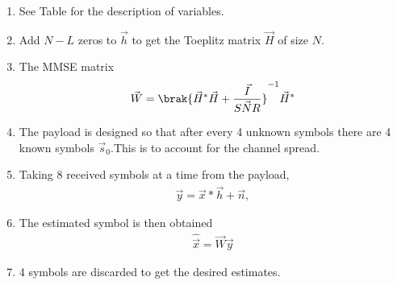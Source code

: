 \begin{enumerate}[label=\thesubsection.\arabic*.,ref=\thesubsection.\theenumi]

\item See Table for the description of variables.
\item Add $N-L$ zeros to $\vec{h}$ to get the Toeplitz matrix $\vec{H}$ of size $N$.
\item The MMSE matrix
\begin{align}
\vec{W} = \brak{\vec{H}^{*}\vec{H} + \frac{\vec{I}}{\vec{SNR}}}^{-1}\vec{H}^{*}
\end{align}
\item The payload is designed so that after every 4 unknown symbols there are 4 known symbols $\vec{s}_0$.This is to account for the channel spread.
\item Taking 8 received symbols at a time from the payload,
\begin{align}
\vec{y} = \vec{x}*\vec{h} + \vec{n},
\end{align}
\item The estimated symbol is then obtained 
\begin{align}
\hat{\vec{x}} = \vec{W}\vec{y}
\end{align}
\item 4 symbols are discarded to get the desired estimates.
\end{enumerate}
